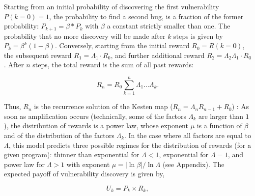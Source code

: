 Starting from an initial probability of discovering the first vulnerability $P(k=0) = 1$, the probability to find a second bug, is a fraction of the former probability: $P_{k+1} = \beta * P_k$ with $\beta$ a constant strictly smaller than one. The probability that no more discovery will be made after $k$ steps is given by $P_k = \beta^{k} (1-\beta)$. Conversely, starting from the initial reward $R_0 = R(k=0)$, the subsequent reward $R_1 = \Lambda_1 \cdot R_0$, and further additional reward $ R_2 = \Lambda_2 \Lambda_1 \cdot R_{0}$. After $n$ steps, the total reward is the sum of all past rewards: 

\begin{equation}
R_{n} = R_{0} \sum_{k=1}^{n} \Lambda_1 ... \Lambda_k.
\end{equation}

Thus, $R_{n}$ is the recurrence solution of the  
Kesten map ($R_{n} = \Lambda_n R_{n-1} +R_0$)
\cite{kesten1973random,sornette1997convergent}:  As soon as amplification occurs (technically, 
some of the factors $\Lambda_k$ are larger than $1$), the distribution
of rewards is a power law, whose exponent $\mu$ is a function of $\beta$
and of the distribution of the factors $\Lambda_k$. In the case where
all factors are equal to $\Lambda$, this model predicts three possible regimes for the distribution of rewards (for a given program): thinner than exponential for $\Lambda < 1$, exponential for $\Lambda = 1$, and power law for $\Lambda > 1$ with exponent $\mu = |\ln \beta|/ \ln \Lambda$ (see Appendix). The expected payoff of vulnerability discovery is given by,

\begin{equation}
\label{ }
U_k = P_k \times R_k,
\end{equation}

